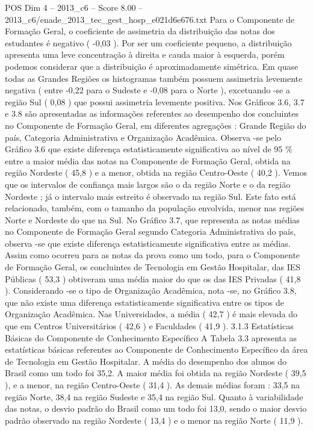 \begin{textsample}{POS Dim 4 – 2013\_c6 – Score 8.00 – 2013\_c6/enade\_2013\_tec\_gest\_hosp\_e021d6e676.txt}
Para o Componente de Formação Geral, o coeficiente de assimetria da distribuição das notas dos estudantes é negativo ( -0,03 ).
Por ser um coeficiente pequeno, a distribuição apresenta uma leve concentração à direita e cauda maior à esquerda, porém podemos considerar que a distribuição é aproximadamente simétrica.
Em quase todas as Grandes Regiões os histogramas também possuem assimetria levemente negativa ( entre -0,22 para o Sudeste e -0,08 para o Norte ), excetuando -se a região Sul ( 0,08 ) que possui assimetria levemente positiva.
Nos Gráficos 3.6, 3.7 e 3.8 são apresentadas as informações referentes ao desempenho dos concluintes no Componente de Formação Geral, em diferentes agregações : Grande Região do país, Categoria Administrativa e Organização Acadêmica.
Observa -se pelo Gráfico 3.6 que existe diferença estatisticamente significativa ao nível de 95 \% entre a maior média das notas na Componente de Formação Geral, obtida na região Nordeste ( 45,8 ) e a menor, obtida na região Centro-Oeste ( 40,2 ).
Vemos que os intervalos de confiança mais largos são o da região Norte e o da região Nordeste ; já o intervalo mais estreito é observado na região Sul.
Este fato está relacionado, também, com o tamanho da população envolvida, menor nas regiões Norte e Nordeste do que na Sul.
No Gráfico 3.7, que representa as notas médias no Componente de Formação Geral segundo Categoria Administrativa do país, observa -se que existe diferença estatisticamente significativa entre as médias.
Assim como ocorreu para as notas da prova como um todo, para o Componente de Formação Geral, os concluintes de Tecnologia em Gestão Hospitalar, das IES Públicas ( 53,3 ) obtiveram uma média maior do que os das IES Privadas ( 41,8 ).
Considerando -se o tipo de Organização Acadêmica, nota -se, no Gráfico 3.8, que não existe uma diferença estatisticamente significativa entre os tipos de Organização Acadêmica.
Nas Universidades, a média ( 42,7 ) é mais elevada do que em Centros Universitários ( 42,6 ) e Faculdades ( 41,9 ). 3.1.3 Estatísticas Básicas do Componente de Conhecimento Específico A Tabela 3.3 apresenta as estatísticas básicas referentes ao Componente de Conhecimento Específico da área de Tecnologia em Gestão Hospitalar.
A média do desempenho dos alunos do Brasil como um todo foi 35,2.
A maior média foi obtida na região Nordeste ( 39,5 ), e a menor, na região Centro-Oeste ( 31,4 ).
As demais médias foram : 33,5 na região Norte, 38,4 na região Sudeste e 35,4 na região Sul.
Quanto à variabilidade das notas, o desvio padrão do Brasil como um todo foi 13,0, sendo o maior desvio padrão observado na região Nordeste ( 13,4 ) e o menor na região Norte ( 11,9 ).

\end{textsample}
